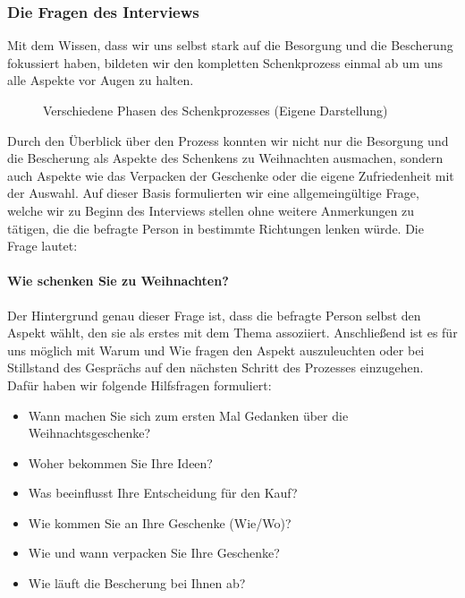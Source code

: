 \documentclass[12pt,ngerman, fleqn]{book} %
\begin{document}
\subsubsection{Die Fragen des Interviews}
Mit dem Wissen, dass wir uns selbst stark auf die Besorgung und die Bescherung fokussiert haben, bildeten wir den kompletten Schenkprozess einmal ab um uns alle Aspekte vor Augen zu halten.\\

\begin{figure}[ht]
    \centering
    \caption{Verschiedene Phasen des Schenkprozesses (Eigene Darstellung)}
    \label{fig:prozess}
\end{figure}

Durch den Überblick über den Prozess konnten wir nicht nur die Besorgung und die Bescherung als Aspekte des Schenkens zu Weihnachten ausmachen, sondern auch Aspekte wie das Verpacken der Geschenke oder die eigene Zufriedenheit mit der Auswahl. Auf dieser Basis formulierten wir eine allgemeingültige Frage, welche wir zu Beginn des Interviews stellen ohne weitere Anmerkungen zu tätigen, die die befragte Person in bestimmte Richtungen lenken würde. Die Frage lautet:

\paragraph{Wie schenken Sie zu Weihnachten?}
Der Hintergrund genau dieser Frage ist, dass die befragte Person selbst den Aspekt wählt, den sie als erstes mit dem Thema assoziiert. Anschließend ist es für uns möglich mit Warum und Wie fragen den Aspekt auszuleuchten oder bei Stillstand des Gesprächs auf den nächsten Schritt des Prozesses einzugehen. Dafür haben wir folgende Hilfsfragen formuliert:

\begin{itemize}
    \item Wann machen Sie sich zum ersten Mal Gedanken über die Weihnachtsgeschenke?
    \item Woher bekommen Sie Ihre Ideen?
    \item Was beeinflusst Ihre Entscheidung für den Kauf?
    \item Wie kommen Sie an Ihre Geschenke (Wie/Wo)?
    \item Wie und wann verpacken Sie Ihre Geschenke?
    \item Wie läuft die Bescherung bei Ihnen ab?
\end{itemize}
\end{document}

